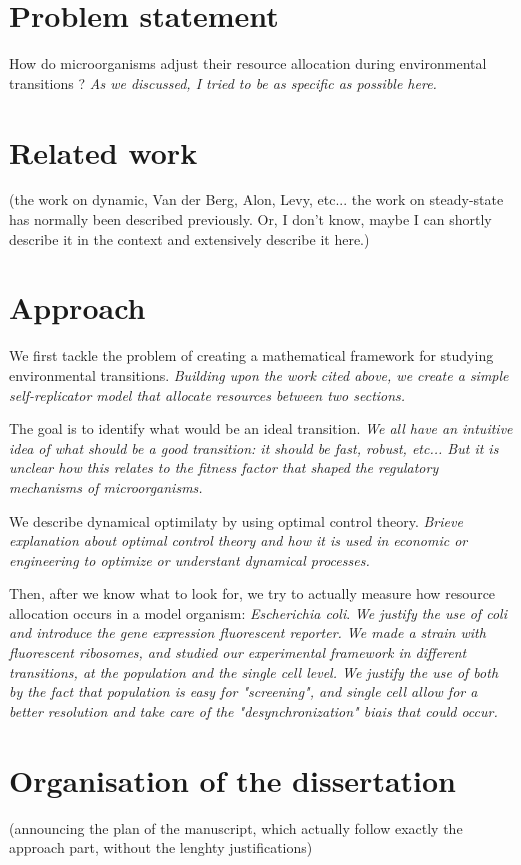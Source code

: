 \section{Problem statement}

How do microorganisms adjust their resource allocation during environmental transitions ?
\textit{As we discussed, I tried to be as specific as possible here.}

\section{Related work}

(the work on dynamic, Van der Berg, Alon, Levy, etc... the work on steady-state has normally been described previously. Or, I don't know, maybe I can shortly describe it in the context and extensively describe it here.)

\section{Approach}

We first tackle the problem of creating a mathematical framework for studying environmental transitions.
\textit{Building upon the work cited above, we create a simple self-replicator model that allocate resources between two sections.}

The goal is to identify what would be an ideal transition.
\textit{We all have an intuitive idea of what should be a good transition: it should be fast, robust, etc... But it is unclear how this relates to the fitness factor that shaped the regulatory mechanisms of microorganisms.}

We describe dynamical optimilaty by using optimal control theory.
\textit{Brieve explanation about optimal control theory and how it is used in economic or engineering to optimize or understant dynamical processes.}

Then, after we know what to look for, we try to actually measure how resource allocation occurs in a model organism: \textit{Escherichia coli}.
\textit{We justify the use of coli and introduce the gene expression fluorescent reporter.
We made a strain with fluorescent ribosomes, and studied our experimental framework in different transitions, at the population and the single cell level.
We justify the use of both by the fact that population is easy for "screening", and single cell allow for a better resolution and take care of the "desynchronization" biais that could occur.}

\section{Organisation of the dissertation}

(announcing the plan of the manuscript, which actually follow exactly the approach part, without the lenghty justifications)